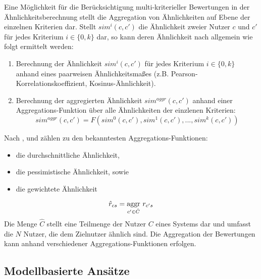 Eine Möglichkeit für die Berücksichtigung multi-kriterieller Bewertungen in der Ähnlichkeitsberechnung stellt die Aggregation von Ähnlichkeiten auf Ebene der einzelnen Kriterien dar.
Stellt $sim^{i}(c,c')$ die Ähnlichkeit zweier Nutzer $c$ und $c'$ für jedes Kriterium $i \in \{0,k\}$ dar, so kann deren Ähnlichkeit nach \textcite[S. 427]{recommenderSystems:2016} allgemein wie folgt ermittelt werden:
\begin{enumerate}
    \item Berechnung der Ähnlichkeit $sim^{i}(c,c')$ für jedes Kriterium $i \in \{0,k\}$ anhand eines paarweisen Ähnlichkeitsmaßes (z.B. Pearson-Korrelations\-koeffizient, Kosinus-Ähnlichkeit).
    \item Berechnung der aggregierten Ähnlichkeit $sim^{aggr}(c,c')$ anhand einer Aggregations-Funktion über alle Ähnlichkeiten der einzlenen Kriterien:
    \begin{equation}
        sim^{aggr}(c,c') = F(sim^{0}(c,c'), sim^{1}(c,c'), ..., sim^{k}(c,c'))
    \end{equation}
\end{enumerate}

Nach \textcite[S. 427]{recommenderSystems:2016}, \textcite[S. 857]{adomavicius:4:inbook} und \textcite[S. 738]{adomavicius:inproceedings} zählen  zu den bekanntesten Aggregations-Funktionen:
\begin{itemize}
    \item die durchschnittliche Ähnlichkeit,
    \item die pessimistische Ähnlichkeit, sowie
    \item die gewichtete Ähnlichkeit
\end{itemize}


\begin{equation}
    \hat{r}_{cs}=\underset{c' \in \hat{C}}{\textnormal{aggr}}\textnormal{ }r_{c's}
\end{equation}
Die Menge $\hat{C}$ stellt eine Teilmenge der Nutzer $C$ eines Systems dar und umfasst die $N$ Nutzer, die dem Zielnutzer ähnlich sind.
Die Aggregation der Bewertungen kann anhand verschiedener Aggregations-Funktionen erfolgen.

\subsection{Modellbasierte Ansätze}

